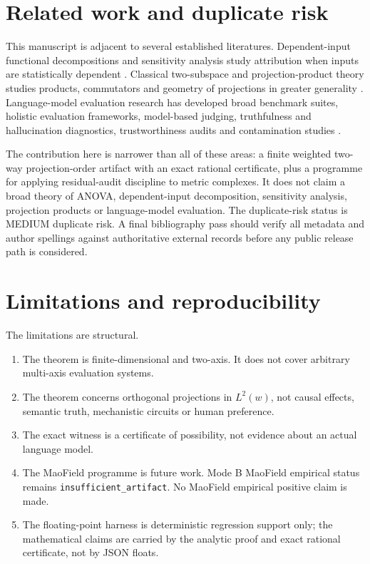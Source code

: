 \documentclass[11pt]{article}
\theoremstyle{remark}
\begin{document}
\section{Related work and duplicate risk}

This manuscript is adjacent to several established literatures. Dependent-input functional decompositions and sensitivity analysis study attribution when inputs are statistically dependent \cite{hooker2007,chastaing2012,chastaing2015,owenprieur2017,ioossprieur2019,ilidrissi2025,lamboni2026}. Classical two-subspace and projection-product theory studies products, commutators and geometry of projections in greater generality \cite{halmos1969,boettcherspitkovsky2010,corachmaestripieri2010}. Language-model evaluation research has developed broad benchmark suites, holistic evaluation frameworks, model-based judging, truthfulness and hallucination diagnostics, trustworthiness audits and contamination studies \cite{bigbench2022,helm2022,truthfulqa2021,selfcheckgpt2023,geval2023,mtbench2023,decodingtrust2023,llmevalsurvey2023,contamination2024,rethinkingcontamination2023}.

The contribution here is narrower than all of these areas: a finite weighted two-way projection-order artifact with an exact rational certificate, plus a programme for applying residual-audit discipline to metric complexes. It does not claim a broad theory of ANOVA, dependent-input decomposition, sensitivity analysis, projection products or language-model evaluation. The duplicate-risk status is MEDIUM duplicate risk. A final bibliography pass should verify all metadata and author spellings against authoritative external records before any public release path is considered.

\section{Limitations and reproducibility}

The limitations are structural.
\begin{enumerate}[leftmargin=*,itemsep=2pt]
\item The theorem is finite-dimensional and two-axis. It does not cover arbitrary multi-axis evaluation systems.
\item The theorem concerns orthogonal projections in $L^2(w)$, not causal effects, semantic truth, mechanistic circuits or human preference.
\item The exact witness is a certificate of possibility, not evidence about an actual language model.
\item The MaoField programme is future work. Mode B MaoField empirical status remains \texttt{insufficient\_artifact}. No MaoField empirical positive claim is made.
\item The floating-point harness is deterministic regression support only; the mathematical claims are carried by the analytic proof and exact rational certificate, not by JSON floats.
\end{enumerate}
\end{document}
